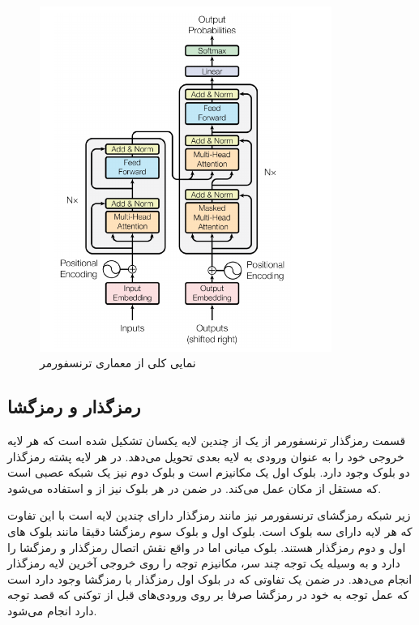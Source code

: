 \begin{figure}[h]
	\centering
	\includegraphics[width=0.85\textwidth]{images/chap3/transformer_arch.png}
	\caption[نمایی کلی از معماری ترنسفورمر]
	{
		نمایی کلی از معماری ترنسفورمر
		\cite{transformer}
	}
	\label{fig:chap3:transfoermer_overview}
\end{figure}

\subsection{رمزگذار و رمزگشا}
قسمت رمزگذار ترنسفورمر از یک 
از چندین لایه یکسان تشکیل شده است که هر لایه خروجی خود را به عنوان ورودی به لایه بعدی تحویل می‌دهد. در هر لایه پشته رمزگذار دو بلوک وجود دارد. بلوک اول یک مکانیزم 
است و بلوک دوم نیز یک شبکه عصبی 
است که مستقل از مکان عمل می‌کند. در ضمن در هر بلوک نیز از 
و 
استفاده می‌شود.

زیر شبکه رمزگشای ترنسفورمر نیز مانند رمزگذار دارای چندین لایه است با این تفاوت که هر لایه دارای سه بلوک است. بلوک اول و بلوک سوم رمزگشا دقیقا مانند بلوک های اول و دوم رمزگذار هستند. بلوک میانی اما در واقع نقش اتصال رمزگذار و رمزگشا را دارد و به وسیله یک توجه چند سر، مکانیزم توجه را روی خروجی آخرین لایه رمزگذار انجام می‌دهد. در ضمن یک تفاوتی که در بلوک اول رمزگذار با رمزگشا وجود دارد است که عمل توجه به خود در رمزگشا صرفا بر روی ورودی‌های قبل از توکنی که قصد توجه دارد انجام می‌شود.


